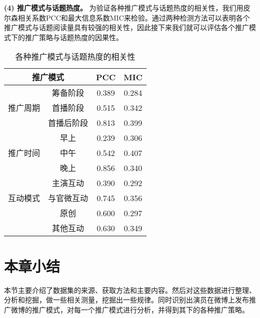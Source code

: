 \textbf{(4) 推广模式与话题热度。}
为验证各种推广模式与话题热度的相关性，我们用皮尔森相关系数PCC和最大信息系数MIC来检验。通过两种检测方法可以表明各个推广模式与话题阅读量具有较强的相关性，因此接下来我们就可以评估各个推广模式下的推广策略与话题热度的因果性。

\begin{table}[!htbp]
\centering
\caption{各种推广模式与话题热度的相关性}
\begin{tabular}{|c|c|c|c|} \hline
\multicolumn{2}{|c|}{推广模式}&PCC&MIC\\ \hline
\multirow{3}{*}{推广周期} & 筹备阶段&0.389&0.284\\%
&首播阶段&0.515&0.342\\%
&首播后阶段&0.813&0.399\\ \hline
\multirow{3}{*}{推广时间} &早上&0.239&0.306\\%
&中午&0.542&0.407\\%
&晚上&0.856&0.340\\ \hline
\multirow{3}{*}{互动模式} &主演互动&0.390&0.292\\%
&与官微互动&0.745&0.356\\%
&原创&0.600&0.297\\ 
&其他互动&0.630&0.349\\ 
\hline\end{tabular}
\end{table}

\section{本章小结}

本节主要介绍了数据集的来源、获取方法和主要内容。然后对这些数据进行整理、分析和挖掘，做一些相关测量，挖掘出一些规律。同时识别出演员在微博上发布推广微博的推广模式，对每一个推广模式进行分析，并得到其下的各种推广策略。




















































